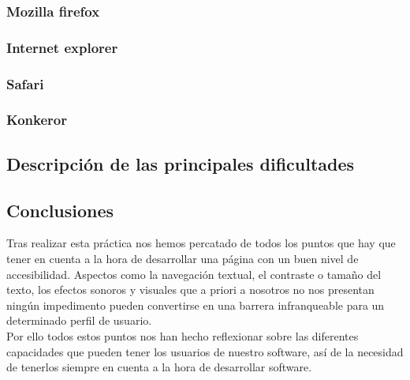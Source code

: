 \subsubsection{Mozilla firefox}
\subsubsection{Internet explorer}
\subsubsection{Safari}
\subsubsection{Konkeror}
\subsection{Descripción de las principales dificultades}
\subsection{Conclusiones}
Tras realizar esta práctica nos hemos percatado de todos los puntos que hay que tener en cuenta a la hora de desarrollar una página con un buen nivel de accesibilidad. Aspectos como la navegación textual, el contraste o tamaño del texto, los efectos sonoros y visuales que a priori a nosotros no nos presentan ningún impedimento pueden convertirse en una barrera infranqueable para un determinado perfil de usuario.\\
Por ello todos estos puntos nos han hecho reflexionar sobre las diferentes capacidades que pueden tener los usuarios de nuestro software, así de la necesidad de tenerlos siempre en cuenta a la hora de desarrollar software.